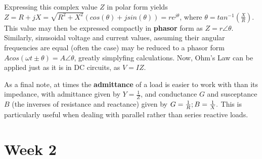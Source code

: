 \documentclass{article}
\begin{document}
Expressing this complex value \(Z\) in polar form yields \(Z = R + jX = \sqrt{R^2 + X^2}(cos(\theta) + jsin(\theta)) = r e^{j \theta}\), where \(\theta = tan^{-1}(\frac{X}{R}).\) This value may then be expressed compactly in \textbf{phasor} form as \(Z = r\angle{\theta}\). Similarly, sinusoidal voltage and current values, assuming their angular frequencies are equal (often the case) may be reduced to a phasor form \(Acos(\omega t \pm \theta) = A\angle{\theta}\), greatly simplyfing calculations. Now, Ohm's Law can be applied just as it is in DC circuits, as \(V = IZ\).

As a final note, at times the \textbf{admittance} of a load is easier to work with than its impedance, with admittance given by \(Y = \frac{1}{Z}\), and conductance \(G\) and susceptance \(B\) (the inverses of resistance and reactance) given by \(G = \frac{1}{R} \space ; \space B = \frac{1}{X}.\) This is particularly useful when dealing with parallel rather than series reactive loads.
\section{Week 2}
\end{document}
